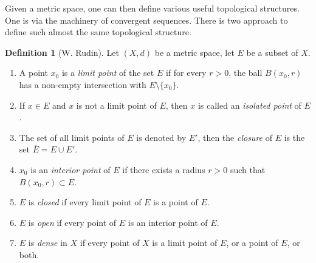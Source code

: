 \documentclass{book}
\newcommand{\titl}[1]{\noindent\textbf{#1}}
\begin{document}
Given a metric space, one can then define various useful topological structures. One is via the machinery of convergent sequences. There is two approach to define such almost the same topological structure.
\begin{framed}
\titl{Definition 1} (W. Rudin). Let $(X,d)$ be a metric space, let $E$ be a subset of $X$.
    \begin{enumerate}
        \item A point $x_0$ is a \emph{limit point} of the set $E$ if for every $r>0$, the ball $B(x_0,r)$ has a non-empty intersection with $E\setminus\{x_0\}$.
        \item If $x\in E$ and $x$ is not a limit point of $E$, then $x$ is called an \emph{isolated point} of $E$.
        \item The set of all limit points of $E$ is denoted by $E'$, then the \emph{closure} of $E$ is the set $\overline E=E\cup E'$.
        \item $x_0$ is an \emph{interior point} of $E$ if there exists a radius $r>0$ such that $B(x_0,r)\subset E$.
        \item $E$ is \emph{closed} if every limit point of $E$ is a point of $E$.
        \item $E$ is \emph{open} if every point of $E$ is an interior point of $E$.
        \item $E$ is \emph{dense} in $X$ if every point of $X$ is a limit point of $E$, or a point of $E$, or both.
    \end{enumerate}
\end{framed}
\end{document}
